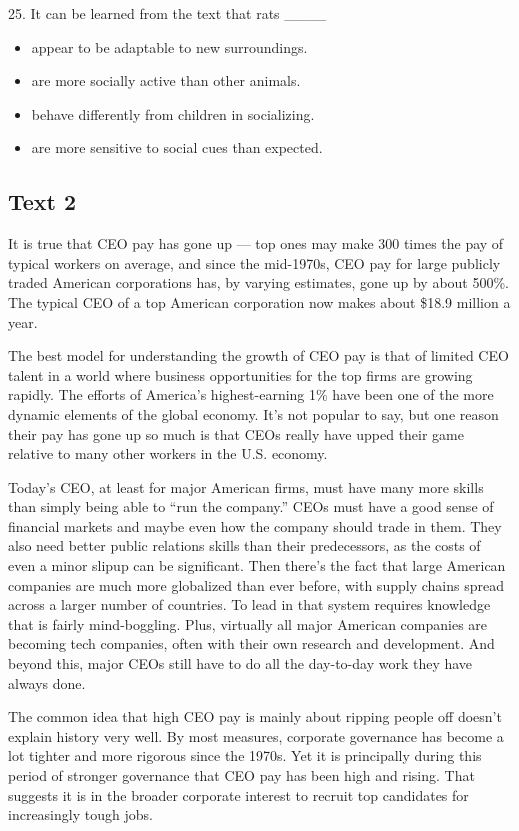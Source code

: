 \documentclass[UTF8,11pt]{ctexart}
\begin{document}
25. It can be learned from the text that rats \_\_\_\_


\begin{itemize}[leftmargin=2em,itemsep=.2em,topsep=.4em]\item[A.] appear to be adaptable to new surroundings.
\item[B.] are more socially active than other animals.
\item[C.] behave differently from children in socializing.
\item[D.] are more sensitive to social cues than expected.
\end{itemize}

\subsection*{\textbf{Text 2}}


It is true that CEO pay has gone up — top ones may make 300 times the pay of typical workers on average, and since the mid-1970s, CEO pay for large publicly traded American corporations has, by varying estimates, gone up by about 500\%. The typical CEO of a top American corporation now makes about \$18.9 million a year.


The best model for understanding the growth of CEO pay is that of limited CEO talent in a world where business opportunities for the top firms are growing rapidly. The efforts of America’s highest-earning 1\% have been one of the more dynamic elements of the global economy. It’s not popular to say, but one reason their pay has gone up so much is that CEOs really have upped their game relative to many other workers in the U.S. economy.


Today’s CEO, at least for major American firms, must have many more skills than simply being able to “run the company.” CEOs must have a good sense of financial markets and maybe even how the company should trade in them. They also need better public relations skills than their predecessors, as the costs of even a minor slipup can be significant. Then there’s the fact that large American companies are much more globalized than ever before, with supply chains spread across a larger number of countries. To lead in that system requires knowledge that is fairly mind-boggling. Plus, virtually all major American companies are becoming tech companies, often with their own research and development. And beyond this, major CEOs still have to do all the day-to-day work they have always done.


The common idea that high CEO pay is mainly about ripping people off doesn’t explain history very well. By most measures, corporate governance has become a lot tighter and more rigorous since the 1970s. Yet it is principally during this period of stronger governance that CEO pay has been high and rising. That suggests it is in the broader corporate interest to recruit top candidates for increasingly tough jobs.
\end{document}
